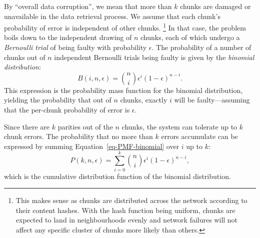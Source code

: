\documentclass[manuscript,screen,review]{acmart}
\begin{document}
By ``overall data corruption'', we mean that more than $k$ chunks are damaged or unavailable in the data retrieval process. We assume that each chunk's probability of error is independent of other chunks.%
%
\footnote{This makes sense as chunks are distributed across the network according to their content hashes. With the hash function being uniform, chunks are expected to land in neighbourhoods evenly and network failures will not affect any specific cluster of chunks more likely than others.}
In that case, the problem boils down to the independent drawing of $n$ chunks, each of which undergo a \emph{Bernoulli trial} of being faulty with probability $\epsilon$. The probability of a number of chunks out of $n$ independent Bernoulli trials being faulty is given by the \emph{binomial distribution}:
\begin{equation}
  B(i, n, \epsilon) = \binom{n}{i} \epsilon^i (1-\epsilon)^{n-i} .
  \label{eq-PMF-binomial}
\end{equation}
This expression is the probability mass function for the binomial distribution, yielding the probability that out of $n$ chunks, exactly $i$ will be faulty---assuming that the per-chunk probability of error is $\epsilon$.

Since there are $k$ parities out of the $n$ chunks, the system can tolerate up to $k$ chunk errors. The probability that no more than $k$ errors accumulate can be expressed by summing Equation~\ref{eq-PMF-binomial} over $i$ up to $k$:
\begin{equation}
  P(k, n, \epsilon) = \sum_{i=0}^k \binom{n}{i} \epsilon^i (1-\epsilon)^{n-i} ,
  \label{eq-CDF-binomial}
\end{equation}
which is the cumulative distribution function of the binomial distribution.
\end{document}
